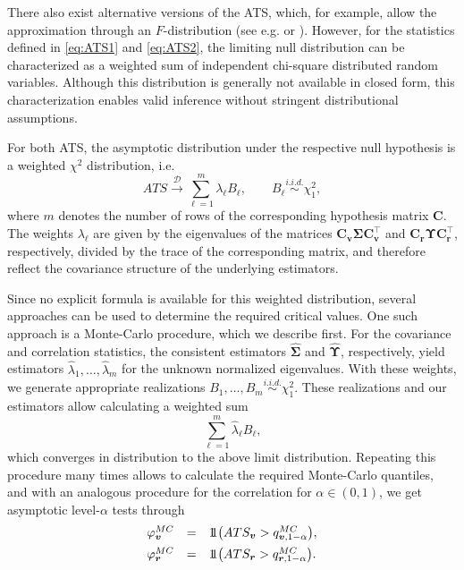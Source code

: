 There also exist alternative versions of the ATS, which, for example, allow the
approximation through an \(F\)-distribution (see e.g.
\citet{brunner2019} or \citet{thiel2024}). However, for the statistics
defined in \eqref{eq:ATS1} and \eqref{eq:ATS2}, the limiting null distribution can be characterized as a weighted sum of independent chi-square distributed random variables. Although this distribution is generally not available in closed form, this characterization enables valid inference without stringent distributional assumptions.

For both ATS, the asymptotic distribution under the respective null hypothesis
is a weighted \(\chi^2\) distribution, i.e.
\begin{equation}
ATS
\stackrel{\mathcal D}{\longrightarrow}
\sum_{\ell=1}^{m} \lambda_\ell B_\ell,
\qquad
B_\ell \stackrel{i.i.d.}{\sim} \chi_1^2,
\label{eq:weighted-limit}
\end{equation}
where \(m\) denotes the number of rows of the corresponding hypothesis matrix
\(\boldsymbol{C}\). The weights \(\lambda_\ell\) are given by the eigenvalues of the matrices
\(\boldsymbol{C}_{\boldsymbol{v}} \boldsymbol{\Sigma} \boldsymbol{C}_{\boldsymbol{v}}^\top\) and
\(\boldsymbol{C}_{\boldsymbol{r}} \boldsymbol{\Upsilon} \boldsymbol{C}_{\boldsymbol{r}}^\top\),
respectively, divided by the trace of the corresponding matrix, and
therefore reflect the covariance structure of the underlying estimators.

Since no explicit formula is available for this weighted distribution, several
approaches can be used to determine the required critical values. One such
approach is a Monte-Carlo procedure, which we describe first. For the covariance and correlation statistics, the consistent estimators
\(\widehat{\boldsymbol{\Sigma}}\) and \(\widehat{\boldsymbol{\Upsilon}}\),
respectively, yield estimators \(\hat{\lambda}_1,\dots,\hat{\lambda}_m\)
for the unknown normalized eigenvalues. With
these weights, we generate appropriate realizations
\(B_1, \dots, B_m \stackrel{i.i.d.}{\sim} \chi_1^2\). These realizations and our
estimators allow calculating a weighted sum
\begin{equation}
\sum_{\ell=1}^{m} \hat{\lambda}_\ell B_\ell,
\label{eq:mc-weighted-sum}
\end{equation}
which converges in distribution to the above limit distribution. Repeating
this procedure many times allows to calculate the required Monte-Carlo
quantiles, and with an analogous procedure for the correlation for
\(\alpha \in (0,1)\), we get asymptotic level-\(\alpha\) tests through
\begin{equation}
\begin{array}{lrl}
\varphi_{\boldsymbol{v}}^{MC}
&=&
1\hspace{-0.7ex}1
\bigl(
ATS_{\boldsymbol{v}}
>
q_{\boldsymbol{v}, 1-\alpha}^{MC}
\bigr),
\\[0.5em]
\varphi_{\boldsymbol{r}}^{MC}
&=&
1\hspace{-0.7ex}1
\bigl(
ATS_{\boldsymbol{r}}
>
q_{\boldsymbol{r}, 1-\alpha}^{MC}
\bigr).
\end{array}
\label{eq:mc-tests}
\end{equation}

